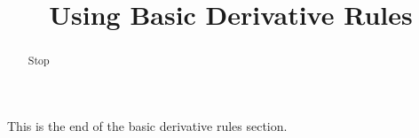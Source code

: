 \documentclass[handout]{ximera}
\title{Using Basic Derivative Rules}
\begin{document}
\begin{abstract} Stop
\end{abstract}

\maketitle

This is the end of the basic derivative rules section.
\end{document}
